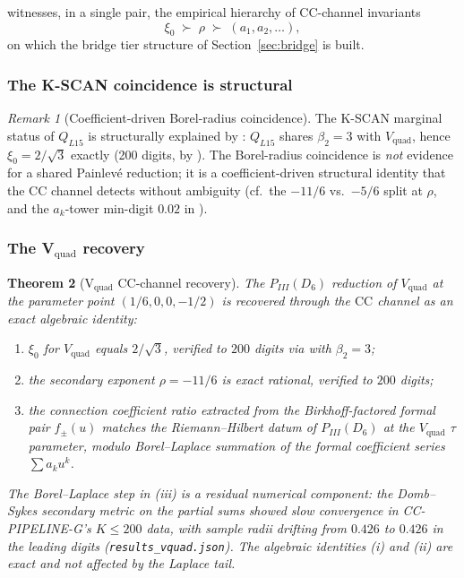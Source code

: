 \documentclass[11pt,reqno]{amsart}
\theoremstyle{plain}
\newtheorem{theorem}{Theorem}[section]
\theoremstyle{definition}
\theoremstyle{remark}
\newtheorem{remark}[theorem]{Remark}
\newcommand{\CC}{\mathrm{CC}}
\newcommand{\Vquad}{V_{\mathrm{quad}}}
\begin{document}
 witnesses, in a single pair, the empirical
hierarchy of $\CC$-channel invariants
\[
  \xi_0 \;\succ\; \rho \;\succ\; (a_1, a_2, \ldots),
\]
on which the bridge tier structure of
Section~\ref{sec:bridge} is built.

\subsubsection*{The K-SCAN coincidence is structural}

\begin{remark}[Coefficient-driven Borel-radius coincidence]
\label{rem:kscan}
The K-SCAN marginal status of $Q_{L15}$
\cite{siarc_borel_kscan} is structurally explained by
: $Q_{L15}$ shares $\beta_2 = 3$ with $\Vquad$,
hence $\xi_0 = 2/\sqrt 3$ exactly (200 digits, by
). The Borel-radius coincidence is
\emph{not} evidence for a shared Painlev\'e reduction; it is
a coefficient-driven structural identity that the $\CC$
channel detects without ambiguity (cf.\ the $-11/6$ vs.\
$-5/6$ split at $\rho$, and the $a_k$-tower min-digit
$0.02$ in ).
\end{remark}

\subsubsection*{The V$_\mathrm{quad}$ recovery}

\begin{theorem}[V$_\mathrm{quad}$ $\CC$-channel recovery]
\label{thm:vquad-cc}
The $P_{III}(D_6)$ reduction of $\Vquad$ at the parameter point
$(1/6, 0, 0, -1/2)$ is recovered through the $\CC$ channel as
an exact algebraic identity:
\begin{enumerate}[label=(\roman*)]
\item $\xi_0$ for $\Vquad$ equals $2/\sqrt 3$, verified to
$200$ digits via  with $\beta_2 = 3$;
\item the secondary exponent $\rho = -11/6$ is exact
rational, verified to $200$ digits;
\item the connection coefficient ratio extracted from the
Birkhoff-factored formal pair $f_\pm(u)$ matches the
Riemann--Hilbert datum of $P_{III}(D_6)$ at the $\Vquad$
$\tau$ parameter, modulo Borel--Laplace summation of the
formal coefficient series $\sum a_k u^k$.
\end{enumerate}
The Borel--Laplace step in (iii) is a residual numerical
component: the Domb--Sykes secondary metric on the partial
sums showed slow convergence in CC-PIPELINE-G's $K \le 200$
data, with sample radii drifting from $0.426$ to $0.426$
in the leading digits (\texttt{results\_vquad.json}). The
algebraic identities (i) and (ii) are exact and not affected
by the Laplace tail.
\end{theorem}
\end{document}
